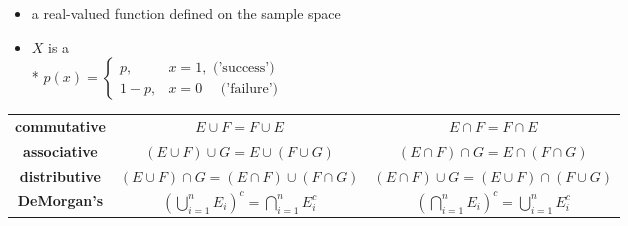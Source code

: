\documentclass[10pt, landscape]{article}
\begin{document}
\begin{multicols*}{3}
  \begin{itemize}
    \item {} a real-valued function defined on the sample space
    \item $X$ is a  
      \\* $p(x) = \begin{cases}
        p, &x=1, \text{ ('success')} \\
        1-p, &x=0\quad  \text{ ('failure')}
      \end{cases}$
  \end{itemize}










































\end{multicols*}

\begin{center}
  \begin{tabular}{ccc}
    \textbf{commutative} & $E \cup F = F \cup E$ & $E \cap F = F \cap E$ \\
    \textbf{associative} & $(E \cup F) \cup G = E \cup (F \cup G)$ &  $(E \cap F) \cap G = E \cap (F \cap G)$ \\
    \textbf{distributive} & $(E \cup F) \cap G = (E \cap F) \cup (F \cap G)$ & $(E \cap F) \cup G = (E \cup F) \cap (F \cup G)$ \\
    \textbf{DeMorgan's} & $(\bigcup\limits^n_{i=1} E_i)^c = \bigcap\limits^n_{i=1}E_i^c$ & $(\bigcap\limits^n_{i=1}E_i)^c = \bigcup\limits^n_{i=1}E_i^c$ \\
  \end{tabular}
\end{center}
\end{document}
